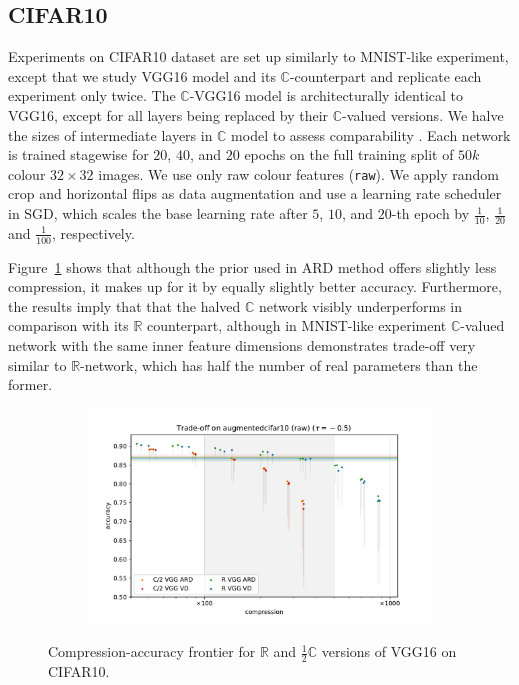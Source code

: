\documentclass[a4paper,10pt]{article}
\newcommand{\real}{\mathbb{R}}
\newcommand{\cplx}{\mathbb{C}}
\begin{document}
\subsection{CIFAR10} %
\label{sub:cifar10}

Experiments on CIFAR10 dataset are set up similarly to MNIST-like experiment, except
that we study VGG16 model \citep{simonyan_very_2015} and its $\cplx$-counterpart and
replicate each experiment only twice.
%
The $\cplx$-VGG16 model is architecturally identical to VGG16, except for all layers being
replaced by their $\cplx$-valued versions. We halve the sizes of intermediate layers in
$\cplx$ model to assess comparability \citep{monning_evaluation_2018}.
%
Each network is trained stagewise for $20$, $40$,
and $20$ epochs on the full training split of $50k$ colour $32\times32$ images. We use
only raw colour features (\texttt{raw}). We apply random crop and horizontal flips as
data augmentation and use a learning rate scheduler in SGD, which scales the base learning
rate after $5$, $10$, and $20$-th epoch by $\tfrac1{10}$, $\tfrac1{20}$ and $\tfrac1{100}$,
respectively.

Figure~\ref{fig:figure__cifar10__trade-off} shows that although the prior used in ARD method
offers slightly less compression, it makes up for it by equally slightly better accuracy.
Furthermore, the results imply that that the halved $\cplx$ network visibly underperforms
in comparison with its $\real$ counterpart, although in MNIST-like experiment $\cplx$-valued
network with the same inner feature dimensions demonstrates trade-off very similar to
$\real$-network, which has half the number of real parameters than the former.

\begin{figure}[!t]
  \centering
  \begin{subfigure}[b]{0.9\textwidth}  %
    \centering
    \includegraphics[width=\columnwidth]{figure__cifar__trade-off/legacy__augmentedcifar10__raw__-0.5.pdf}
  \end{subfigure}
  \caption{%
    Compression-accuracy frontier for $\real$ and $\tfrac12 \cplx$ versions of VGG16 on CIFAR10.
  }
  \label{fig:figure__cifar10__trade-off}
\end{figure}
\end{document}
